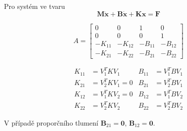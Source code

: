 \documentclass{article}
\begin{document}
	Pro systém ve tvaru
	\begin{equation}
	\bm{M}\bm{\ddot{x}} + \bm{B}\bm{\dot{x}} + \bm{K}\bm{x} = \bm{F}
	\end{equation}

	\begin{equation}
	A
	=
	\begin{bmatrix}
		0 & 0 & 1 & 0 \\
		0 & 0 & 0 & 1 \\
		-K_{11} & -K_{12} & -B_{11} & -B_{12} \\
		-K_{21} & -K_{22} & -B_{21} & -B_{22}
	\end{bmatrix}
\end{equation}

\begin{align}
	K_{11} &= V_1^T K V_1 & 
	B_{11} &= V_1^T B V_1 \\
	K_{21} &= V_2^T K V_1 = 0 &
	B_{21} &= V_2^T B V_1 \\
	K_{12} &= V_1^T K V_2 = 0 &
	B_{12} &= V_1^T B V_2 \\
	K_{22} &= V_2^T K V_2 &
	B_{22} &= V_2^T B V_2 
\end{align}

V případě proporčního tlumení $\bm{B}_{21} = \bm{0}$, $\bm{B}_{12} = \bm{0}$.

\end{document}
